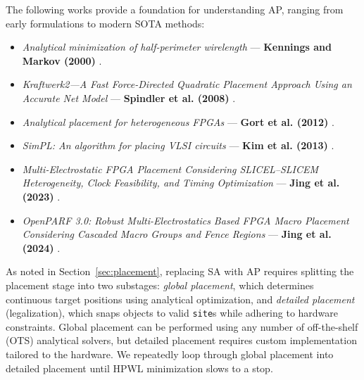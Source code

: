 The following works provide a foundation for understanding AP, ranging from early formulations to modern SOTA methods:
\begin{itemize}
    \item \emph{Analytical minimization of half-perimeter wirelength} — \textbf{Kennings and Markov (2000)} \cite{AP_2000}.
    \item \emph{Kraftwerk2—A Fast Force-Directed Quadratic Placement Approach Using an Accurate Net Model} — \textbf{Spindler et al. (2008)} \cite{kraftwerk2}.
    \item \emph{Analytical placement for heterogeneous FPGAs} — \textbf{Gort et al. (2012)} \cite{AP_2012}.
    \item \emph{SimPL: An algorithm for placing VLSI circuits} — \textbf{Kim et al. (2013)} \cite{SimPL}.
    \item \emph{Multi-Electrostatic FPGA Placement Considering SLICEL–SLICEM Heterogeneity, Clock Feasibility, and Timing Optimization} — \textbf{Jing et al. (2023)} \cite{MultiElectrostatic}.
    \item \emph{OpenPARF 3.0: Robust Multi-Electrostatics Based FPGA Macro Placement Considering Cascaded Macro Groups and Fence Regions} — \textbf{Jing et al. (2024)} \cite{OpenPARF}.
\end{itemize}

As noted in Section~\ref{sec:placement}, replacing SA with AP requires splitting the placement stage into two substages:  
\emph{global placement}, which determines continuous target positions using analytical optimization, and  
\emph{detailed placement} (legalization), which snaps objects to valid \texttt{site}s while adhering to hardware constraints.  
Global placement can be performed using any number of off-the-shelf (OTS) analytical solvers, but detailed placement requires custom implementation tailored to the hardware.
We repeatedly loop through global placement into detailed placement until HPWL minimization slows to a stop.

